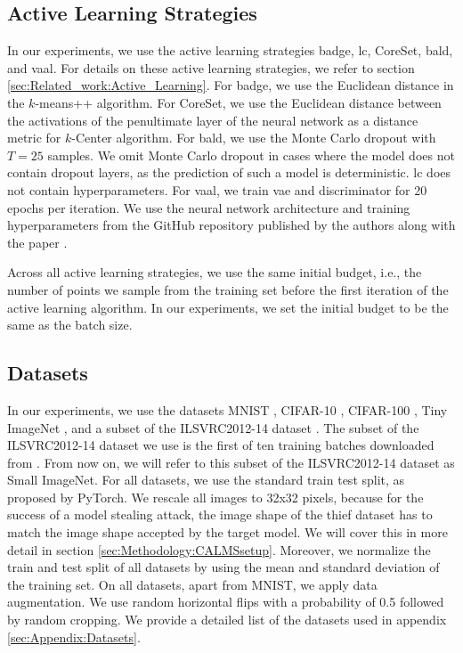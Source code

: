 \subsection{Active Learning Strategies}
\label{sec:ExperimentSetup:ALStrategies}
In our experiments, we use the active learning strategies \gls{badge}, \gls{lc}, CoreSet, \gls{bald}, and \gls{vaal}. For details on these active learning
strategies, we refer to section \ref{sec:Related_work:Active_Learning}. For \gls{badge}, we use the Euclidean distance in the $k$-means++
algorithm. For CoreSet, we use the Euclidean distance between the activations of the penultimate layer of the neural network as a distance metric for $k$-Center
algorithm. For \gls{bald}, we use the Monte Carlo dropout with $T=25$ samples. We omit Monte Carlo dropout in cases where the model does not contain dropout layers,
as the prediction of such a model is deterministic. \gls{lc} does not contain hyperparameters. For \gls{vaal}, we train \gls{vae} and discriminator for 20 epochs
per iteration. We use the neural network architecture and training hyperparameters from the GitHub repository published by the authors along with the paper 
\cite{vaalRepo}. \par
Across all active learning strategies, we use the same initial budget, i.e., the number of points we sample from the training set before the first iteration
of the active learning algorithm. In our experiments, we set the initial budget to be the same as the batch size.

\subsection{Datasets}
\label{sec:ExperimentSetup:Datasets}
In our experiments, we use the datasets MNIST \cite{mnist_web}, CIFAR-10 \cite{cifar},
CIFAR-100 \cite{cifar}, Tiny ImageNet \cite{le2015tiny}, and a subset of the ILSVRC2012-14 dataset \cite{imagenet}. The subset of the ILSVRC2012-14 dataset we
use is the first of ten training batches downloaded from \cite{imageNetDataset}. From now on, we will refer to this subset
of the ILSVRC2012-14 dataset as Small ImageNet. For all datasets, we use the standard train test split, as proposed by PyTorch. We rescale all images to 32x32
pixels, because for the success of a model stealing attack, the image shape of the thief dataset has to match the image shape accepted by the target model. We will cover
this in more detail in section \ref{sec:Methodology:CALMSsetup}. Moreover, we normalize the train and test split of all datasets by using the mean and standard deviation
of the training set. On all datasets, apart from MNIST, we apply data augmentation. We use random horizontal flips with a probability of 0.5
followed by random cropping. We provide a detailed list of the datasets used in appendix \ref{sec:Appendix:Datasets}. \par

